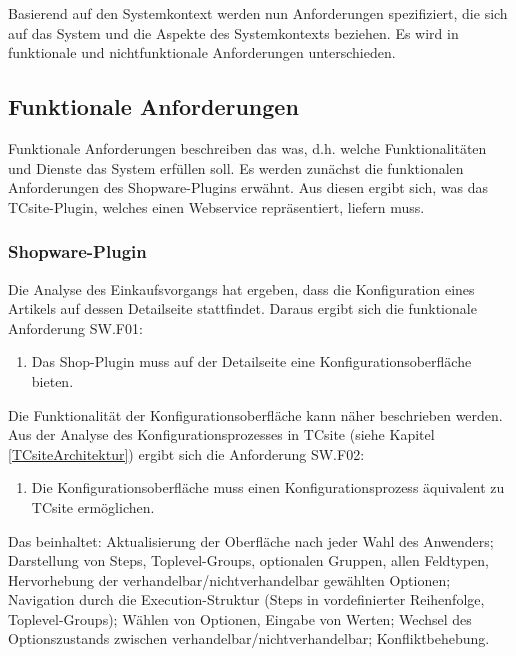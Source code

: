 \documentclass[11pt, a4paper, titlepage, listof=totoc, bibliography=totoc, index=totoc, twoside, openright, headings=normal, draft]{scrreprt}
\begin{document}
Basierend auf den Systemkontext werden nun Anforderungen spezifiziert, die sich auf das System und die Aspekte des Systemkontexts beziehen. Es wird in funktionale und nichtfunktionale Anforderungen unterschieden.

\subsection{Funktionale Anforderungen}

Funktionale Anforderungen beschreiben das \glqq was\grqq{}, d.h. welche Funktionalitäten und Dienste das System erfüllen soll. Es werden zunächst die funktionalen Anforderungen des Shopware-Plugins erwähnt. Aus diesen ergibt sich, was das TCsite-Plugin, welches einen Webservice repräsentiert, liefern muss.

\subsubsection{Shopware-Plugin}
Die Analyse des Einkaufsvorgangs hat ergeben, dass die Konfiguration eines Artikels auf dessen Detailseite stattfindet. Daraus ergibt sich die funktionale Anforderung SW.F01:
\begin{enumerate}[SW.F01:]\bfseries
\item Das Shop-Plugin muss auf der Detailseite eine Konfigurationsoberfläche bieten.
\end{enumerate}
Die Funktionalität der Konfigurationsoberfläche kann näher beschrieben werden. Aus der Analyse des Konfigurationsprozesses in TCsite (siehe Kapitel \ref{TCsiteArchitektur}) ergibt sich die Anforderung SW.F02:
\begin{enumerate}[SW.F02:]\bfseries
\item Die Konfigurationsoberfläche muss einen Konfigurationsprozess äquivalent zu TCsite ermöglichen. 
\end{enumerate}
Das beinhaltet: Aktualisierung der Oberfläche nach jeder Wahl des Anwenders; Darstellung von Steps, Toplevel-Groups, optionalen Gruppen, allen Feldtypen, Hervorhebung der verhandelbar/nichtverhandelbar gewählten Optionen; Navigation durch die Execution-Struktur (Steps in vordefinierter Reihenfolge, Toplevel-Groups); Wählen von Optionen, Eingabe von Werten; Wechsel des Optionszustands zwischen verhandelbar/nichtverhandelbar; Konfliktbehebung.
\end{document}
